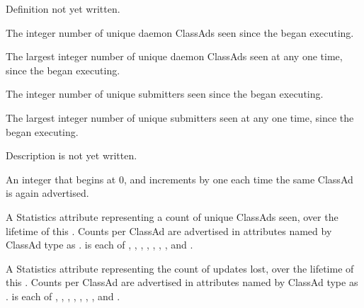 \begin{description}
\item[\AdAttr{RunningJobs}:] Definition not yet written.

\item[\AdAttr{StartdAds}:] The integer number of unique 
  daemon ClassAds seen since the  began executing.

\item[\AdAttr{StartdAdsPeak}:] The largest integer number of unique 
   daemon ClassAds seen at any one time, 
  since the  began executing.

\item[\AdAttr{SubmitterAds}:] The integer number of unique submitters seen
  since the  began executing.

\item[\AdAttr{SubmitterAdsPeak}:] The largest integer number of unique 
  submitters seen at any one time, 
since the  began executing.

\item[\AdAttr{UpdateInterval}:] Description is not yet written.

\item[\AdAttr{UpdateSequenceNumber}:] An integer that begins at 0,
   and increments by one each time the same ClassAd is again advertised.

\item[\AdAttr{UpdatesInitial}:] A Statistics attribute representing
  a count of unique ClassAds seen,
  over the lifetime of this .
  Counts per ClassAd are advertised in attributes named by ClassAd type
  as .
   is each of , ,
  , , , ,
  , and .

\item[\AdAttr{UpdatesLost}:] A Statistics attribute representing
  the count of updates lost,
  over the lifetime of this .
  Counts per ClassAd are advertised in attributes named by ClassAd type
  as .
   is each of , ,
  , , , ,
  , and .


\end{description}
